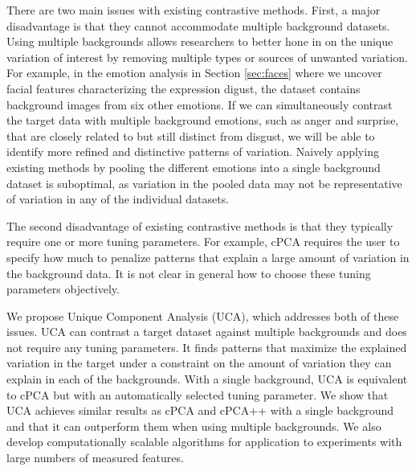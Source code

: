 \documentclass[12pt]{article}
\begin{document}
There are two main issues with existing contrastive methods. First, a major disadvantage is that they cannot accommodate multiple background datasets. Using multiple backgrounds allows researchers to better hone in on the unique variation of interest by removing multiple types or sources of unwanted variation. For example, in the emotion analysis in Section \ref{sec:faces} where we uncover facial features characterizing the expression digust, the dataset contains background images from six other emotions. If we can simultaneously contrast the target data with multiple background emotions, such as anger and surprise, that are closely related to but still distinct from disgust, we will be able to identify more refined and distinctive patterns of variation. Naively applying existing methods by pooling the different emotions into a single background dataset is suboptimal, as variation in the pooled data may not be representative of variation in any of the individual datasets.

The second disadvantage of existing contrastive methods is that they typically require one or more tuning parameters. For example, cPCA requires the user to specify how much to penalize patterns that explain a large amount of variation in the background data. It is not clear in general how to choose these tuning parameters objectively.

We propose Unique Component Analysis (UCA), which addresses both of these issues. %
UCA can contrast a target dataset against multiple backgrounds and does not require any tuning parameters. It finds patterns that maximize the explained variation in the target under a constraint on the amount of variation they can explain in each of the backgrounds. With a single background, UCA is equivalent to cPCA but with an automatically selected tuning parameter. We show that UCA achieves similar results as cPCA and cPCA++ with a single background and that it can outperform them when using multiple backgrounds. We also develop computationally scalable algorithms for application to experiments with large numbers of measured features.
\end{document}

